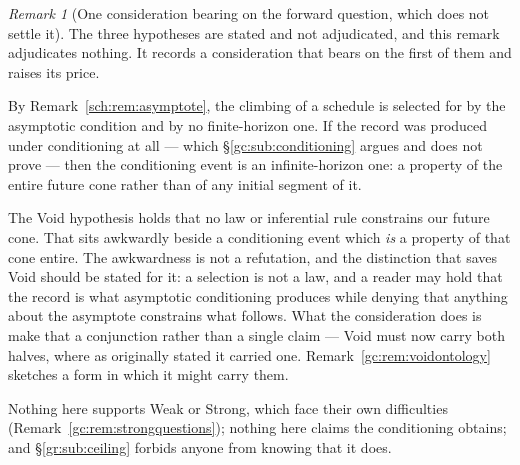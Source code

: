 \documentclass[11pt]{article}
\numberwithin{equation}{section}
\theoremstyle{plain}
\theoremstyle{definition}
\theoremstyle{remark}
\newtheorem{remark}[theorem]{Remark}
\begin{document}
\begin{remark}[One consideration bearing on the forward question, which
does not settle it]\label{gc:rem:asymptoteextrap}
The three hypotheses are stated and not adjudicated, and this remark
adjudicates nothing. It records a consideration that bears on the first
of them and raises its price.

By Remark~\ref{sch:rem:asymptote}, the climbing of a schedule is
selected for by the asymptotic condition and by no finite-horizon one.
If the record was produced under conditioning at all --- which
\S\ref{gc:sub:conditioning} argues and does not prove --- then the
conditioning event is an infinite-horizon one: a property of the entire
future cone rather than of any initial segment of it.

The Void hypothesis holds that no law or inferential rule constrains our
future cone. That sits awkwardly beside a conditioning event which
\emph{is} a property of that cone entire. The awkwardness is not a
refutation, and the distinction that saves Void should be stated for it:
a selection is not a law, and a reader may hold that the record is what
asymptotic conditioning produces while denying that anything about the
asymptote constrains what follows. What the consideration does is make
that a conjunction rather than a single claim --- Void must now carry
both halves, where as originally stated it carried one.
Remark~\ref{gc:rem:voidontology} sketches a form in which it might carry
them.

Nothing here supports Weak or Strong, which face their own difficulties
(Remark~\ref{gc:rem:strongquestions}); nothing here claims the
conditioning obtains; and \S\ref{gr:sub:ceiling} forbids anyone from
knowing that it does.
\end{remark}
\end{document}
